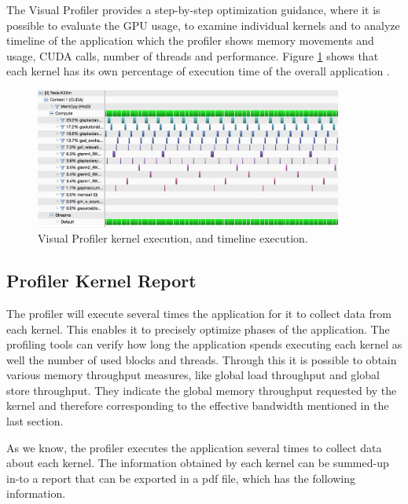 The Visual Profiler provides a step-by-step optimization guidance, where it is possible to evaluate the GPU usage, to examine individual kernels and to analyze timeline of the application which the profiler shows memory movements and usage, CUDA calls, number of threads and performance. Figure \ref{fig:visual01} shows that each kernel has its own percentage of execution time of the overall application \cite{practices}.

\begin{figure}[htbp]
	\centering
		\includegraphics[width=0.9\textwidth]{Figures/pofiler.png}
		\smallskip
	\caption[Visual Profiler timeline and stream process]{Visual Profiler kernel execution, and timeline execution.}
	\label{fig:visual01}
\end{figure}

\subsection{Profiler Kernel Report}

The profiler will execute several times the application for it to collect data from each kernel. This enables it to precisely optimize phases of the application\cite{example}. The profiling tools can verify how long the application spends executing each kernel as well the number of used blocks and threads. Through this it is possible to obtain various memory throughput measures, like global load throughput and global store throughput. They indicate the global memory throughput requested by the kernel and therefore corresponding to the effective bandwidth mentioned in the last section.

As we know, the profiler executes the application several times to collect data about each kernel. The information obtained by each kernel can be summed-up in-to a report that can be exported in a pdf file, which has the following information.

